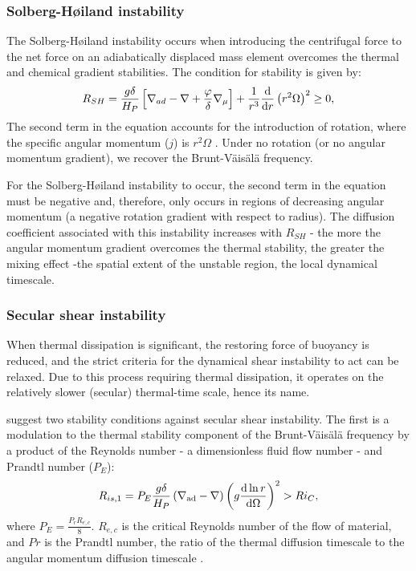 \subsubsection{Solberg-H\o iland instability}

The Solberg-H\o iland instability occurs when introducing the centrifugal force to the net force on an adiabatically displaced mass element overcomes the thermal and chemical gradient stabilities.
The condition for stability is given by:
\begin{equation}
    R_{SH} = \frac{g \delta}{H_P}\left[ \nabla_{ad} - \nabla + \frac{\varphi}{\delta} \nabla_{\mu} \right] + \frac{1}{r^3}\frac{\textmd{d}}{\textmd{d} r}\left(r^2\Omega\right)^2\geq 0,
\end{equation}
The second term in the equation accounts for the introduction of rotation, where the specific angular momentum ($j$) is $r^2\Omega$ \citep{tassoul_theory_1978,kippenhahn_stellar_1990,heger_presupernova_2000}. 
Under no rotation (or no angular momentum gradient), we recover the Brunt-V\"{a}is\"{a}l\"{a} frequency.

For the Solberg-H\o iland instability to occur, the second term in the equation must be negative and, therefore, only occurs in regions of decreasing angular momentum (a negative rotation gradient with respect to radius).
The diffusion coefficient associated with this instability increases with $R_{SH}$ - the more the angular momentum gradient overcomes the thermal stability, the greater the mixing effect -the spatial extent of the unstable region, the local dynamical timescale.

\subsubsection{Secular shear instability}

When thermal dissipation is significant, the restoring force of buoyancy is reduced, and the strict criteria for the dynamical shear instability to act can be relaxed.
Due to this process requiring thermal dissipation, it operates on the relatively slower (secular) thermal-time scale, hence its name.

\citet{endal_evolution_1978} suggest two stability conditions against secular shear instability. The first is a modulation to the thermal stability component of the Brunt-V\"{a}is\"{a}l\"{a} frequency by a product of the Reynolds number - a dimensionless fluid flow number - and Prandtl number ($P_E$):
\begin{equation}
    R_{is,1} = P_E \frac{g \delta}{H_P}\left(\nabla_{\textnormal{ad}} - \nabla \right)\left(g \frac{\textmd{d} \ln r}{\textmd{d} \Omega}\right)^2 > Ri_C,
    \label{eq:ssi1}
\end{equation}
where $P_E = \frac{P_r R_{e,c}}{8}$. $R_{e,c}$ is the critical Reynolds number of the flow of material, and $Pr$ is the Prandtl number, the ratio of the thermal diffusion timescale to the angular momentum diffusion timescale \citep[See][and references therein for a more thorough explanation of these quantities and their implementation in models of stellar rotation]{tassoul_theory_1978,heger_presupernova_1998}.

